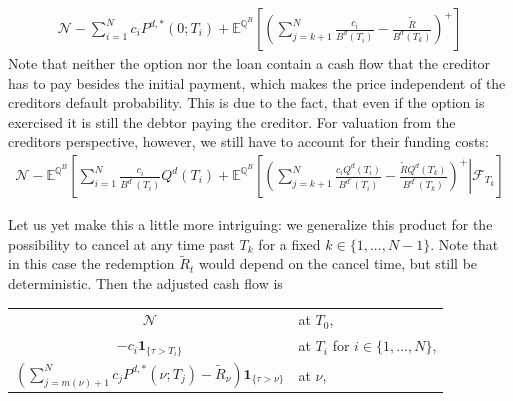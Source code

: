 \documentclass[12pt]{article}
\begin{document}
	\begin{align}\label{eq:priceofcancellableloan}
		\mathcal{N} -\sum_{i=1}^{N}c_iP^{d,*}(0;T_i) +  \mathbb{E}^{\mathbb{Q}^B}\left[\left(\sum_{j=k+1}^{N}\frac{c_i }{B^{d}(T_i)} - \frac{\tilde{R}}{B^{d}(T_k)}\right)^+\right]
	\end{align}
	Note that neither the option nor the loan contain a cash flow that the creditor has to pay besides the initial payment, which makes the price independent of the creditors default probability. This is due to the fact, that even if the option is exercised it is still the debtor paying the creditor. For valuation from the creditors perspective, however, we still have to account for their funding costs:
	\begin{align}\label{eq:valueofcancellableloancreditordefault}
		\mathcal{N} - \mathbb{E}^{\mathbb{Q}^B}\left[\sum_{i=1}^{N}\frac{c_i}{B^{d^c}(T_i)}Q^d(T_i) +  \mathbb{E}^{\mathbb{Q}^B}\left[\left.\left(\sum_{j=k+1}^{N}\frac{c_i Q^d(T_i)}{B^{d^c}(T_i)} - \frac{\tilde{R}Q^d(T_k)}{B^{d^c}(T_k)}\right)^+ \right| \mathcal{F}_{T_k}\right]
	\end{align}
	
	Let us yet make this a little more intriguing: we generalize this product for the possibility to cancel at any time past $T_k$ for a fixed $k \in \{1,...,N-1\}$.
	Note that in this case the redemption $\tilde{R}_t$ would depend on the cancel time, but still be deterministic. Then the adjusted cash flow is
	
	\begin{center}
		\begin{tabular}{cl}
			$\mathcal{N}$ & at $T_0$, \\
			$-c_i\mathbf{1}_{\{\tau > T_i\}}$ 		  & at $T_i$ for $i \in \{1, ..., N\}$, \\
			$\left(\sum_{j=m(\nu)+1}^{N}c_jP^{d,*}(\nu;T_j) - \tilde{R}_\nu\right)\mathbf{1}_{\{\tau > \nu\}}$
			& at $\nu$,
		\end{tabular}
	\end{center}
	
\end{document}
